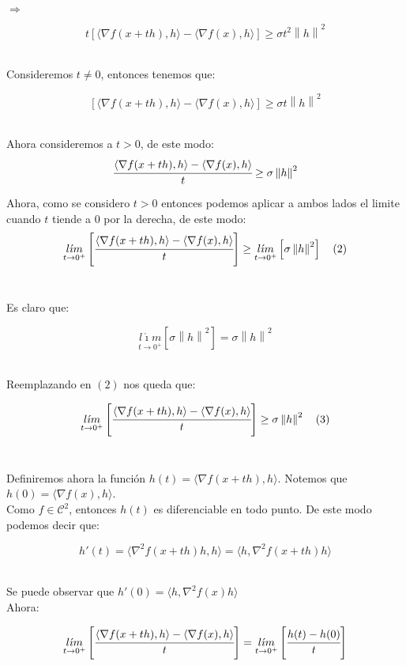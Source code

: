 \documentclass[11pt]{article}
\begin{document}
$ \Rightarrow $ 

\[ t [\langle \nabla f(x+th) ,h \rangle - \langle \nabla f(x) ,h \rangle]  \geq \sigma t^2\left\| h \right\|^{2} \] \

Consideremos $ t \neq 0 $, entonces tenemos que:

\[  [\langle \nabla f(x+th) ,h \rangle - \langle \nabla f(x) ,h \rangle]  \geq \sigma t \left\| h \right\|^{2} \] \

Ahora consideremos a $ t > 0 $, de este modo: \\

\[  \cfrac{\langle \nabla f(x+th) ,h \rangle - \langle \nabla f(x) ,h \rangle}{t}  \geq \sigma \left\| h \right\|^{2} \]

\newpage

Ahora, como se considero $ t > 0 $ entonces podemos aplicar a ambos lados el limite cuando $ t $ tiende a $ 0 $ por la derecha, de este modo: \\

\[  \underset {t \to 0^+} {l \acute{\imath}m} \left[ \cfrac{\langle \nabla f(x+th) ,h \rangle - \langle \nabla f(x) ,h \rangle}{t}  \right] \geq   \underset {t \to 0^+} {l \acute{\imath}m} \left[ \sigma \left\| h \right\|^{2} \right] \ \ \  (2) \] \

Es claro que:

\[ \underset {t \to 0^+} {l \acute{\imath}m} \left[ \sigma \left\| h \right\|^{2} \right] = \sigma \left\| h \right\|^{2} \] \ 

Reemplazando en $(2)$ nos queda que: \


\[  \underset {t \to 0^+} {l \acute{\imath}m} \left[ \cfrac{\langle \nabla f(x+th) ,h \rangle - \langle \nabla f(x) ,h \rangle}{t}  \right] \geq   \sigma \left\| h \right\|^{2}  \ \ \  (3) \] \ \

Definiremos ahora la función $ h(t) = \langle \nabla f(x+th),h \rangle $. Notemos que $ h(0) = \langle \nabla f(x),h \rangle $.  \\

Como $ f \in \mathcal{C}^2 $, entonces $ h(t) $ es diferenciable en todo punto. De este modo podemos decir que: \

\[ h'(t) = \langle \nabla^2 f(x+th) h,h \rangle = \langle h, \nabla^2 f(x+th) h \rangle \] \

Se puede observar que $ h'(0) = \langle h, \nabla^2 f(x) h \rangle $ \\

Ahora:

\[ \underset {t \to 0^+} {l \acute{\imath}m} \left[ \cfrac{\langle \nabla f(x+th) ,h \rangle - \langle \nabla f(x) ,h \rangle}{t}  \right] = \underset {t \to 0^+} {l \acute{\imath}m} \left[ \cfrac{h(t) - h(0)}{t}  \right] \] \\
\end{document}
